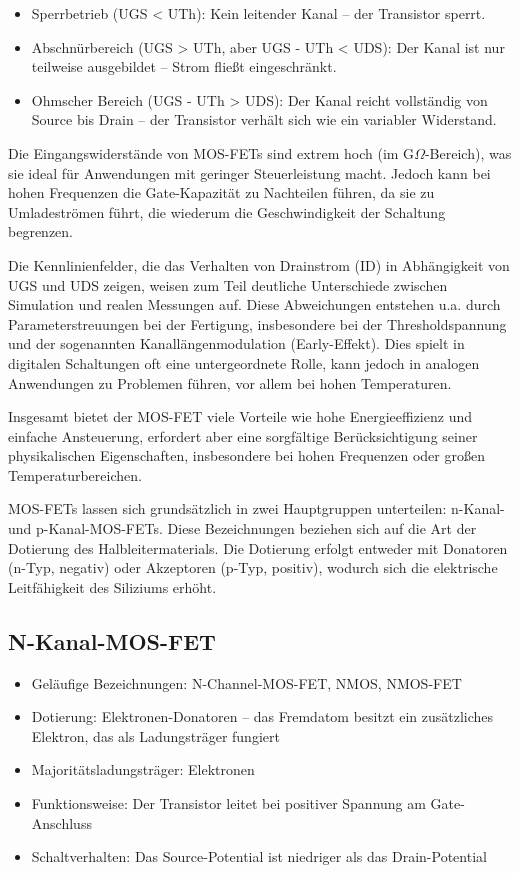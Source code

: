 \begin{itemize}
	\item Sperrbetrieb (UGS < UTh): Kein leitender Kanal – der Transistor sperrt.
	\item Abschnürbereich (UGS > UTh, aber UGS - UTh < UDS): Der Kanal ist nur teilweise ausgebildet – Strom fließt eingeschränkt.
	\item Ohmscher Bereich (UGS - UTh > UDS): Der Kanal reicht vollständig von Source bis Drain – der Transistor verhält sich wie ein variabler Widerstand.
\end{itemize}

Die Eingangswiderstände von MOS-FETs sind extrem hoch (im G$\Omega$-Bereich), was sie ideal für Anwendungen mit geringer Steuerleistung macht. Jedoch kann bei hohen Frequenzen die Gate-Kapazität zu Nachteilen führen, da sie zu Umladeströmen führt, die wiederum die Geschwindigkeit der Schaltung begrenzen.\cite{Alles:2024}

Die Kennlinienfelder, die das Verhalten von Drainstrom (ID) in Abhängigkeit von UGS und UDS zeigen, weisen zum Teil deutliche Unterschiede zwischen Simulation und realen Messungen auf. Diese Abweichungen entstehen u.a. durch Parameterstreuungen bei der Fertigung, insbesondere bei der Thresholdspannung und der sogenannten Kanallängenmodulation (Early-Effekt). Dies spielt in digitalen Schaltungen oft eine untergeordnete Rolle, kann jedoch in analogen Anwendungen zu Problemen führen, vor allem bei hohen Temperaturen.\cite{Alles:2024}

Insgesamt bietet der MOS-FET viele Vorteile wie hohe Energieeffizienz und einfache Ansteuerung, erfordert aber eine sorgfältige Berücksichtigung seiner physikalischen Eigenschaften, insbesondere bei hohen Frequenzen oder großen Temperaturbereichen.\cite{Alles:2024}


MOS-FETs lassen sich grundsätzlich in zwei Hauptgruppen unterteilen: n-Kanal- und p-Kanal-MOS-FETs. Diese Bezeichnungen beziehen sich auf die Art der Dotierung des Halbleitermaterials. Die Dotierung erfolgt entweder mit Donatoren (n-Typ, negativ) oder Akzeptoren (p-Typ, positiv), wodurch sich die elektrische Leitfähigkeit des Siliziums erhöht. \cite{RSOnlineMOSFET:2025}

\subsection{N-Kanal-MOS-FET}
\begin{itemize}
	\item Geläufige Bezeichnungen: N-Channel-MOS-FET, NMOS, NMOS-FET
	\item Dotierung: Elektronen-Donatoren – das Fremdatom besitzt ein zusätzliches Elektron, das als Ladungsträger fungiert
	\item Majoritätsladungsträger: Elektronen
	\item Funktionsweise: Der Transistor leitet bei positiver Spannung am Gate-Anschluss
	\item Schaltverhalten: Das Source-Potential ist niedriger als das Drain-Potential
\end{itemize}

